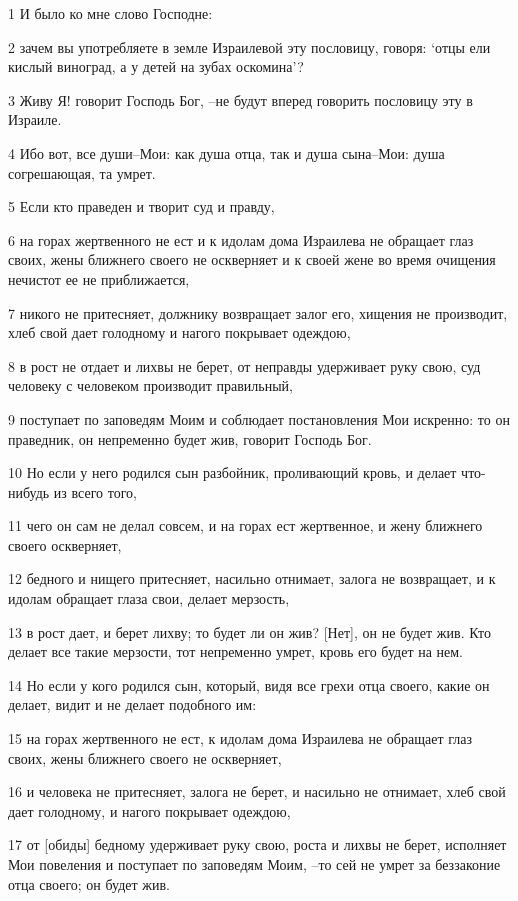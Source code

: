 \par 1 И было ко мне слово Господне:
\par 2 зачем вы употребляете в земле Израилевой эту пословицу, говоря: `отцы ели кислый виноград, а у детей на зубах оскомина'?
\par 3 Живу Я! говорит Господь Бог, --не будут вперед говорить пословицу эту в Израиле.
\par 4 Ибо вот, все души--Мои: как душа отца, так и душа сына--Мои: душа согрешающая, та умрет.
\par 5 Если кто праведен и творит суд и правду,
\par 6 на горах жертвенного не ест и к идолам дома Израилева не обращает глаз своих, жены ближнего своего не оскверняет и к своей жене во время очищения нечистот ее не приближается,
\par 7 никого не притесняет, должнику возвращает залог его, хищения не производит, хлеб свой дает голодному и нагого покрывает одеждою,
\par 8 в рост не отдает и лихвы не берет, от неправды удерживает руку свою, суд человеку с человеком производит правильный,
\par 9 поступает по заповедям Моим и соблюдает постановления Мои искренно: то он праведник, он непременно будет жив, говорит Господь Бог.
\par 10 Но если у него родился сын разбойник, проливающий кровь, и делает что-нибудь из всего того,
\par 11 чего он сам не делал совсем, и на горах ест жертвенное, и жену ближнего своего оскверняет,
\par 12 бедного и нищего притесняет, насильно отнимает, залога не возвращает, и к идолам обращает глаза свои, делает мерзость,
\par 13 в рост дает, и берет лихву; то будет ли он жив? [Нет], он не будет жив. Кто делает все такие мерзости, тот непременно умрет, кровь его будет на нем.
\par 14 Но если у кого родился сын, который, видя все грехи отца своего, какие он делает, видит и не делает подобного им:
\par 15 на горах жертвенного не ест, к идолам дома Израилева не обращает глаз своих, жены ближнего своего не оскверняет,
\par 16 и человека не притесняет, залога не берет, и насильно не отнимает, хлеб свой дает голодному, и нагого покрывает одеждою,
\par 17 от [обиды] бедному удерживает руку свою, роста и лихвы не берет, исполняет Мои повеления и поступает по заповедям Моим, --то сей не умрет за беззаконие отца своего; он будет жив.
